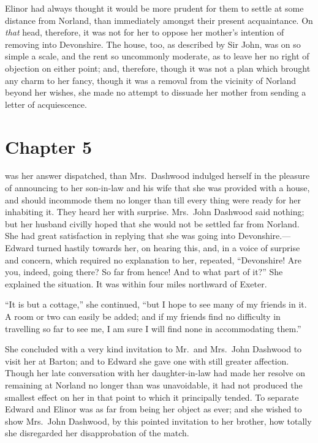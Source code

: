 Elinor had always thought it would be more prudent
for them to settle at some distance from Norland,
than immediately amongst their present acquaintance.
On \emph{that} head, therefore, it was not for her to oppose
her mother's intention of removing into Devonshire.
The house, too, as described by Sir John, was on so
simple a scale, and the rent so uncommonly moderate,
as to leave her no right of objection on either point;
and, therefore, though it was not a plan which brought
any charm to her fancy, though it was a removal from
the vicinity of Norland beyond her wishes, she made
no attempt to dissuade her mother from sending a letter
of acquiescence.



\chapter{Chapter 5}


 was her answer dispatched, than Mrs.\ Dashwood
indulged herself in the pleasure of announcing to her
son-in-law and his wife that she was provided with a house,
and should incommode them no longer than till every thing were
ready for her inhabiting it.  They heard her with surprise.
Mrs.\ John Dashwood said nothing; but her husband civilly
hoped that she would not be settled far from Norland.
She had great satisfaction in replying that she was going
into Devonshire.---Edward turned hastily towards her,
on hearing this, and, in a voice of surprise and concern,
which required no explanation to her, repeated,
``Devonshire! Are you, indeed, going there?  So far from hence!
And to what part of it?''  She explained the situation.
It was within four miles northward of Exeter.

``It is but a cottage,'' she continued, ``but I hope
to see many of my friends in it.  A room or two can
easily be added; and if my friends find no difficulty
in travelling so far to see me, I am sure I will find
none in accommodating them.''

She concluded with a very kind invitation to
Mr.\ and Mrs.\ John Dashwood to visit her at Barton;
and to Edward she gave one with still greater affection.
Though her late conversation with her daughter-in-law had
made her resolve on remaining at Norland no longer than
was unavoidable, it had not produced the smallest effect
on her in that point to which it principally tended.
To separate Edward and Elinor was as far from being her
object as ever; and she wished to show Mrs.\ John Dashwood,
by this pointed invitation to her brother, how totally she
disregarded her disapprobation of the match.

